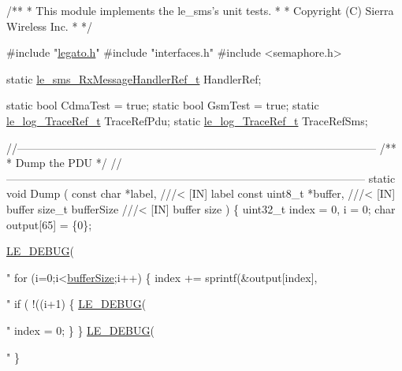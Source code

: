 
\begin{DoxyCodeInclude}
\textcolor{comment}{/**}
\textcolor{comment}{ * This module implements the le\_sms's unit tests.}
\textcolor{comment}{  *}
\textcolor{comment}{  * Copyright (C) Sierra Wireless Inc.}
\textcolor{comment}{  *}
\textcolor{comment}{  */}

\textcolor{preprocessor}{#include "\hyperlink{legato_8h}{legato.h}"}
\textcolor{preprocessor}{#include "interfaces.h"}
\textcolor{preprocessor}{#include <semaphore.h>}

\textcolor{keyword}{static} \hyperlink{le__sms__interface_8h_a77d2607cc541bf0369e69bb2d105d4bf}{le\_sms\_RxMessageHandlerRef\_t} HandlerRef;

\textcolor{keyword}{static} \textcolor{keywordtype}{bool} CdmaTest = \textcolor{keyword}{true};
\textcolor{keyword}{static} \textcolor{keywordtype}{bool} GsmTest = \textcolor{keyword}{true};
\textcolor{keyword}{static} \hyperlink{le__log_8h_a055e29785e8d1c5bf1b3a230df8d65b7}{le\_log\_TraceRef\_t} TraceRefPdu;
\textcolor{keyword}{static} \hyperlink{le__log_8h_a055e29785e8d1c5bf1b3a230df8d65b7}{le\_log\_TraceRef\_t} TraceRefSms;

\textcolor{comment}{//--------------------------------------------------------------------------------------------------}\textcolor{comment}{}
\textcolor{comment}{/**}
\textcolor{comment}{ * Dump the PDU}
\textcolor{comment}{ */}
\textcolor{comment}{//--------------------------------------------------------------------------------------------------}
\textcolor{keyword}{static} \textcolor{keywordtype}{void} Dump
(
    \textcolor{keyword}{const} \textcolor{keywordtype}{char}      *label,     \textcolor{comment}{///< [IN] label}
\textcolor{comment}{}    \textcolor{keyword}{const} uint8\_t   *buffer,    \textcolor{comment}{///< [IN] buffer}
\textcolor{comment}{}    \textcolor{keywordtype}{size\_t}           bufferSize \textcolor{comment}{///< [IN] buffer size}
\textcolor{comment}{})
\{
    uint32\_t index = 0, i = 0;
    \textcolor{keywordtype}{char} output[65] = \{0\};

    \hyperlink{le__log_8h_a2a91ea8857cf190fde71d85ba930a498}{LE\_DEBUG}(\textcolor{stringliteral}{"%
    \textcolor{keywordflow}{for} (i=0;i<\hyperlink{namespacemk_1_1detail_a1108ca5affa7b4add72c7164eb650949}{bufferSize};i++)
    \{
        index += sprintf(&output[index],\textcolor{stringliteral}{"%
        \textcolor{keywordflow}{if} ( !((i+1)%
        \{
            \hyperlink{le__log_8h_a2a91ea8857cf190fde71d85ba930a498}{LE\_DEBUG}(\textcolor{stringliteral}{"%
            index = 0;
        \}
    \}
    \hyperlink{le__log_8h_a2a91ea8857cf190fde71d85ba930a498}{LE\_DEBUG}(\textcolor{stringliteral}{"%
\}

}}}}
\end{DoxyCodeInclude}
